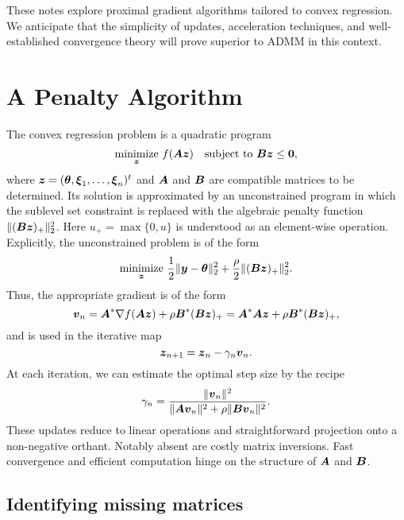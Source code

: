 \documentclass{article}
\begin{document}
These notes explore proximal gradient algorithms tailored to convex regression.
We anticipate that the simplicity of updates, acceleration techniques, and well-established convergence theory will prove superior to ADMM in this context.

\section*{\center A Penalty Algorithm}

The convex regression problem is a quadratic program
\begin{equation*}
    \underset{\boldsymbol{z}}{\mathrm{minimize}}
    ~f(\boldsymbol{A} \boldsymbol{z}) \quad
    \text{subject to}
    ~\boldsymbol{B} \boldsymbol{z} \le \boldsymbol{0},
\end{equation*}
where \(\boldsymbol{z} = (\boldsymbol{\theta}, \boldsymbol{\xi}_{1}, \ldots, \boldsymbol{\xi}_{n})^{t}\) and \(\boldsymbol{A}\) and \(\boldsymbol{B}\) are compatible matrices to be determined.
Its solution is approximated by an unconstrained program in which the sublevel set constraint is replaced with the algebraic penalty function \(\|(\boldsymbol{B} \boldsymbol{z})_{+}\|_{2}^{2}\).
Here \(u_{+} = \max\{0, u\}\) is understood as an element-wise operation.
Explicitly, the unconstrained problem is of the form
\begin{equation*}
    \underset{\boldsymbol{z}}{\mathrm{minimize}}
    ~\frac{1}{2} \|\boldsymbol{y} - \boldsymbol{\theta}\|^{2}_{2}
    + \frac{\rho}{2} \|(\boldsymbol{B} \boldsymbol{z})_{+}\|_{2}^{2}.
\end{equation*}
Thus, the appropriate gradient is of the form
\begin{equation*}
    \boldsymbol{v}_{n}
    =
    \boldsymbol{A}^{\ast} \nabla f(\boldsymbol{A} \boldsymbol{z}) + \rho \boldsymbol{B}^{\ast}(\boldsymbol{B} \boldsymbol{z})_{+}
    =
    \boldsymbol{A}^{\ast} \boldsymbol{A} \boldsymbol{z} + \rho \boldsymbol{B}^{\ast} (\boldsymbol{B} \boldsymbol{z})_{+},
\end{equation*}
and is used in the iterative map
\begin{equation*}
    \boldsymbol{z}_{n+1} = \boldsymbol{z}_{n} - \gamma_{n} \boldsymbol{v}_{n}.
\end{equation*}
At each iteration, we can estimate the optimal step size by the recipe
\begin{equation*}
    \gamma_{n}
    =
    \frac{\|\boldsymbol{v}_{n}\|^{2}}{\|\boldsymbol{A} \boldsymbol{v}_{n}\|^{2} + \rho \|\boldsymbol{B} \boldsymbol{v}_{n}\|^{2}}.
\end{equation*}
These updates reduce to linear operations and straightforward projection onto a non-negative orthant.
Notably absent are costly matrix inversions.
Fast convergence and efficient computation hinge on the structure of \(\boldsymbol{A}\) and \(\boldsymbol{B}\).

\subsection*{Identifying missing matrices}
\end{document}
